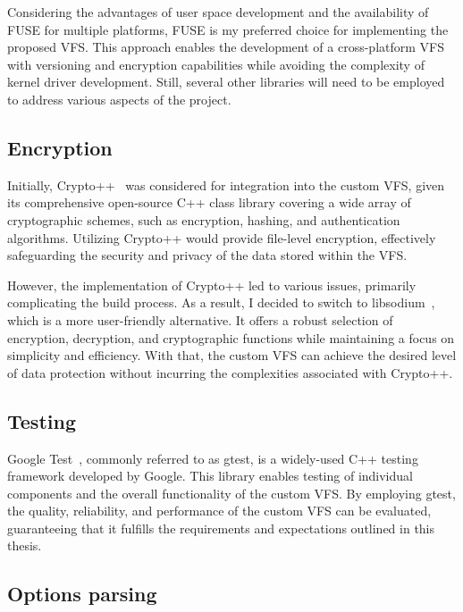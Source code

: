 Considering the advantages of user space development and the availability of FUSE for multiple platforms, FUSE is my preferred choice for implementing the proposed VFS\@.
This approach enables the development of a cross-platform VFS with versioning and encryption capabilities while avoiding the complexity of kernel driver development.
Still, several other libraries will need to be employed to address various aspects of the project.

\subsection{Encryption}\label{subsec:encryption-analysis}

Initially, Crypto++~\cite{crypto_pp} was considered for integration into the custom VFS, given its comprehensive open-source C++ class library covering a wide array of cryptographic schemes, such as encryption, hashing, and authentication algorithms.
Utilizing Crypto++ would provide file-level encryption, effectively safeguarding the security and privacy of the data stored within the VFS\@.

However, the implementation of Crypto++ led to various issues, primarily complicating the build process.
As a result, I decided to switch to libsodium~\cite{libsodium}, which is a more user-friendly alternative.
It offers a robust selection of encryption, decryption, and cryptographic functions while maintaining a focus on simplicity and efficiency.
With that, the custom VFS can achieve the desired level of data protection without incurring the complexities associated with Crypto++.

\subsection{Testing}\label{subsec:gtest}

Google Test~\cite{google_test}, commonly referred to as gtest, is a widely-used C++ testing framework developed by Google.
This library enables testing of individual components and the overall functionality of the custom VFS\@.
By employing gtest, the quality, reliability, and performance of the custom VFS can be evaluated, guaranteeing that it fulfills the requirements and expectations outlined in this thesis.

\subsection{Options parsing}\label{subsec:options-parsing}

